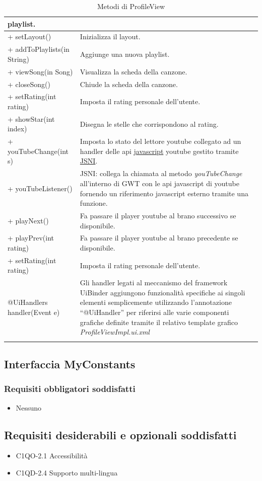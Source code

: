 \begin{longtable}{|p{}|p{}|}
playlist.\\\hline 
+ setLayout() & Inizializza il layout.\\\hline
+ addToPlaylists(in String) & Aggiunge una nuova playlist.\\\hline 
+ viewSong(in Song) & Visualizza la scheda della canzone.\\\hline
+ closeSong() & Chiude la scheda della canzone.\\\hline
+ setRating(int rating) & Imposta il rating personale dell'utente.\\\hline
+ showStar(int index) & Disegna le stelle che corrispondono al rating.\\\hline
+ youTubeChange(int s) & Imposta lo stato del lettore youtube collegato
ad un handler delle api \underline{javascript} youtube gestito tramite
\underline{JSNI}.\\\hline + youTubeListener() & JSNI: collega la chiamata al
metodo \emph{youTubeChange} all'interno di GWT con le api javascript di
youtube fornendo un riferimento javascript esterno tramite una funzione.\\\hline
+ playNext() & Fa passare il player youtube al brano successivo se
disponibile.\\\hline
+ playPrev(int rating) & Fa passare il player youtube al brano
precedente se disponibile.\\\hline
+ setRating(int rating) & Imposta il rating personale dell'utente.\\\hline
@UiHandlers handler(Event e) & Gli handler legati al meccanismo del framework
UiBinder aggiungono funzionalit\`a specifiche ai singoli elementi
semplicemente utilizzando l'annotazione ``@UiHandler'' per riferirsi alle varie
componenti grafiche definite tramite il relativo template grafico
\emph{ProfileViewImpl.ui.xml}\\\hline
\caption{Metodi di ProfileView}
\end{longtable}

\subsection{Interfaccia MyConstants}
\subsubsection*{Requisiti obbligatori soddisfatti}
\begin{itemize}
    \item Nessuno
\end{itemize}
\subsection*{Requisiti desiderabili e opzionali soddisfatti}
\begin{itemize}
    \item C1QO-2.1 Accessibilit\`a
    \item C1QD-2.4 Supporto multi-lingua
\end{itemize}
